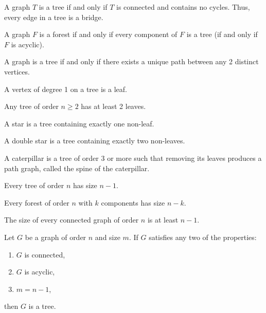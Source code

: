 \documentclass{article}
\begin{document}
\medskip{}

    A graph $T$ is a tree if and only if $T$ is connected and contains no cycles.
    Thus, every edge in a tree is a bridge.

\medskip{}

    A graph $F$ is a forest if and only if every component of $F$ is a tree (if and only if $F$ is acyclic).

\medskip{}

    A graph is a tree if and only if there exists a unique path between any 2 distinct vertices.

\medskip{}

    A vertex of degree 1 on a tree is a leaf.

\medskip{}

    Any tree of order $n \geq 2$ has at least 2 leaves.

\medskip{}

    A star is a tree containing exactly one non-leaf.

\medskip{}

    A double star is a tree containing exactly two non-leaves.

\medskip{}

    A caterpillar is a tree of order 3 or more such that removing its leaves produces a path graph, called the spine of the caterpillar.

\medskip{}

    Every tree of order $n$ has size $n-1$.

\medskip{}

    Every forest of order $n$ with $k$ components has size $n-k$.

\medskip{}

    The size of every connected graph of order $n$ is at least $n-1$.

\medskip{}

    Let $G$ be a graph of order $n$ and size $m$. If $G$ satisfies any two of the properties:
    \begin{enumerate}
        \item $G$ is connected,
        \item $G$ is acyclic,
        \item $m = n - 1$,
    \end{enumerate}
    then $G$ is a tree.
\end{document}
